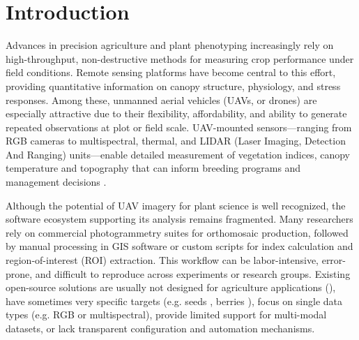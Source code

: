 \documentclass[drones,technicalnote,accept,pdftex,moreauthors]{Definitions/mdpi}
\begin{document}
\section{Introduction}
\label{intro}
Advances in precision agriculture and plant phenotyping increasingly rely on high-throughput, non-destructive methods for measuring crop performance under field conditions. Remote sensing platforms have become central to this effort, providing quantitative information on canopy structure, physiology, and stress responses. Among these, unmanned aerial vehicles (UAVs, or drones) are especially attractive due to their flexibility, affordability, and ability to generate repeated observations at plot or field scale. UAV-mounted sensors—ranging from RGB cameras to multispectral, thermal, and LIDAR (Laser Imaging, Detection And Ranging) units—enable detailed measurement of vegetation indices, canopy temperature and topography that can inform breeding programs and management decisions \cite{machwitz2021bridging}.

Although the potential of UAV imagery for plant science is well recognized, the software ecosystem supporting its analysis remains fragmented. Many researchers rely on commercial photogrammetry suites for orthomosaic production, followed by manual processing in GIS software or custom scripts for index calculation and region-of-interest (ROI) extraction. This workflow can be labor-intensive, error-prone, and difficult to reproduce across experiments or research groups. Existing open-source solutions are usually not designed for agriculture applications (\cite{moyroud2018introduction}), have sometimes very specific targets (e.g. seeds \cite{tang2024grabseeds}, berries \cite{loarca2024berryportraits}), focus on single data types (e.g. RGB or multispectral), provide limited support for multi-modal datasets, or lack transparent configuration and automation mechanisms. 
\end{document}
